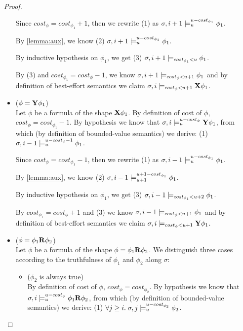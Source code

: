 \begin{theorem}
\begin{lemma}
\begin{proof}
\begin{itemize}
    Since $cost_\phi = cost_{\phi_1} + 1$, then we rewrite (1) as  $\sigma,i+1 \models_{u}^{u-cost_{\phi_1}} \phi_1$.

    By \autoref{lemma:aux}, we know (2) $\sigma,i+1 \models_{u}^{u-cost_{\phi_1}} \phi_1$.

    By inductive hypothesis on $\phi_1$, we get (3) $\sigma,i+1 \models_{cost_{\phi_1} < u} \phi_1$.

    By (3) and $cost_{\phi_1} = cost_\phi - 1$, we know $\sigma,i+1 \models_{cost_\phi < u + 1} \phi_1$ and by definition of best-effort semantics we claim $\sigma,i \models_{cost_\phi < u + 1} \mathbf{X} \phi_1$.
    
    \item ($\phi = \mathbf{Y} \phi_1$) \\
    Let $\phi$ be a formula of the shape $\mathbf{X} \phi_1$.
    By definition of cost of $\phi$, $cost_\phi = cost_{\phi_1} - 1$.
    By hypothesis we know that $\sigma,i \models_{u}^{u-cost_\phi} \mathbf{Y} \phi_1$, from which (by definition of bounded-value semantics) we derive: 
    (1) $\sigma,i-1 \models_{u}^{u-cost_\phi-1} \phi_1$.

    Since $cost_\phi = cost_{\phi_1} - 1$, then we rewrite (1) as  $\sigma,i-1 \models_{u}^{u-cost_{\phi_1}} \phi_1$.

    By \autoref{lemma:aux}, we know (2) $\sigma,i-1 \models_{u+1}^{u+1-cost_{\phi_1}} \phi_1$.

    By inductive hypothesis on $\phi_1$, we get (3) $\sigma,i-1 \models_{cost_{\phi_1} < u + 2} \phi_1$.

    By $cost_{\phi_1} = cost_\phi + 1$ and (3) we know $\sigma,i-1 \models_{cost_\phi < u + 1} \phi_1$ and by definition of best-effort semantics we claim $\sigma,i \models_{cost_\phi < u + 1} \mathbf{Y} \phi_1$.
    
    \item ($\phi = \phi_1 \mathbf{R} \phi_2$) \\
    Let $\phi$ be a formula of the shape $\phi = \phi_1 \mathbf{R} \phi_2$.
    We distinguish three cases according to the truthfulness of $\phi_1$ and $\phi_2$ along $\sigma$:
    \begin{itemize}
        \item ($\phi_2$ is always true) \\
        By definition of cost of $\phi$, $cost_\phi = cost_{\phi_2}$.
        By hypothesis we know that $\sigma,i \models_{u}^{u-cost_\phi} \phi_1 \mathbf{R} \phi_2$, from which (by definition of bounded-value semantics) we derive: 
        (1) $\forall j \geq i.\; \sigma,j \models_{u}^{u-cost_{\phi_2}} \phi_2$.


\end{itemize}
\end{itemize}
\end{proof}
\end{lemma}
\end{theorem}
